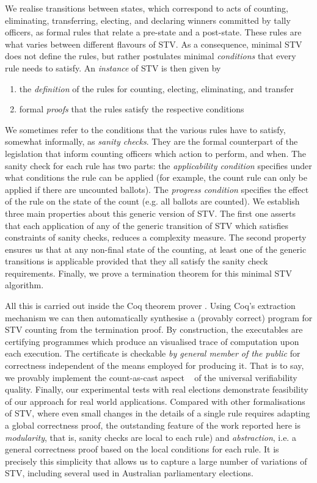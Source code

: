 \documentclass{llncs}
\begin{document}
We realise transitions between states, which correspond to acts of counting,
eliminating, transferring, electing, and declaring winners committed
by tally officers, as formal rules that relate a pre-state and a
post-state. These rules are what varies between different flavours
of STV. As a consequence, minimal STV does not define the rules, but
rather postulates minimal \emph{conditions} that every rule needs to
satisfy. An \emph{instance} of STV is then given by
\begin{enumerate}
\item the \emph{definition} of the rules for counting, electing,
eliminating, and transfer
\item formal \emph{proofs} that the rules satisfy the respective
conditions
\end{enumerate}

\noindent
We sometimes refer to the conditions that the various rules have to
satisfy, somewhat informally, as \emph{sanity checks}. They are the
formal counterpart of the  legislation that inform counting officers
which action to perform, and when. 
The sanity check for each rule has two parts: the
\emph{applicability condition} specifies under what conditions the
rule can be applied (for example, the count rule can only be applied
if there are uncounted ballots). The \emph{progress condition}
specifies the effect of the rule on the state of the count (e.g.
all ballots are counted). 
We establish
three  main properties about this generic version of STV. The first
one asserts that each application of any of the generic transition
of STV which satisfies constraints of sanity checks, reduces a
complexity measure. The second property ensures us that at any
non-final state of the counting, at least one of the generic
transitions is applicable provided that they all satisfy the sanity
check requirements. Finally, we prove a termination theorem for
this minimal STV algorithm. 

All this is carried out inside the Coq theorem prover
\cite{Bertot:2004:ITP}.  Using Coq's extraction mechanism
\cite{Letouzey:2003:NEC} we can then automatically synthesise a
(provably correct) program for STV counting from the termination
proof.  
By construction, the executables are certifying programmes which
produce an visualised trace of computation upon each execution. The
certificate is checkable \emph{by general member of the public} for
correctness independent of the means employed for producing it.
That is to say, we provably implement the count-as-cast
aspect ~\cite{DBLP:journals/iacr/CortierGKMT16} of the universal
verifiability quality. Finally, our experimental tests with real
elections demonstrate feasibility of our approach for  real world
applications. Compared with other formalisations of STV, where
even small changes in the details of a single rule requires adapting
a global correctness proof, the outstanding feature of the work
reported here is \emph{modularity}, that is, sanity checks are local to each
rule) and \emph{abstraction}, i.e. a general correctness proof based
on the local conditions for each rule. It is precisely this
simplicity that allows us to capture a large number of variations of STV,
including several used in Australian parliamentary elections.
 
\end{document}
